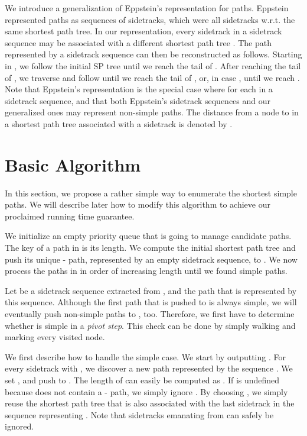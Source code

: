 \documentclass[runningheads,a4paper]{llncs}
\begin{document}
We introduce a generalization of Eppstein's representation \cite{DBLP:journals/siamcomp/Eppstein98} for paths.
Eppstein represented paths as sequences of sidetracks, which were all sidetracks w.r.t. the same shortest path tree.
In our representation, every sidetrack  in a sidetrack sequence may be associated with a different shortest path tree .
The path represented by a sidetrack sequence  can then be reconstructed as follows.
Starting in , we follow the initial SP tree  until we reach the tail of .
After reaching the tail of , we traverse  and follow  until we reach the tail of , or, in case , until we reach .
Note that Eppstein's representation is the special case where  for each  in a sidetrack sequence, and that both Eppstein's sidetrack sequences and our generalized ones may represent non-simple paths.
The distance from a node  to  in a shortest path tree  associated with a sidetrack  is denoted by .


\section{Basic Algorithm}
\label{sec:simple-algo}

In this section, we propose a rather simple way to enumerate the  shortest simple paths.
We will describe later how to modify this algorithm to achieve our proclaimed running time guarantee.

We initialize an empty priority queue  that is going to manage candidate paths.
The key of a path in  is its length.
We compute the initial shortest path tree  and push its unique - path, represented by an empty sidetrack sequence, to .
We now process the paths in  in order of increasing length until we found  simple paths.

Let  be a sidetrack sequence extracted from , and  the path that is represented by this sequence.
Although the first path that is pushed to  is always simple, we will eventually push non-simple paths to , too.
Therefore, we first have to determine whether  is simple in a \emph{pivot step}.
This check can be done by simply walking  and marking every visited node.

We first describe how to handle the simple case.
We start by outputting .
For every sidetrack  with , we discover a new path  represented by the sequence .
We set , and push  to .
The length of  can easily be computed as .
If  is undefined because  does not contain a - path, we simply ignore .
By choosing , we simply reuse the shortest path tree that is also associated with the last sidetrack in the sequence representing .
Note that sidetracks emanating from  can safely be ignored.
\end{document}
